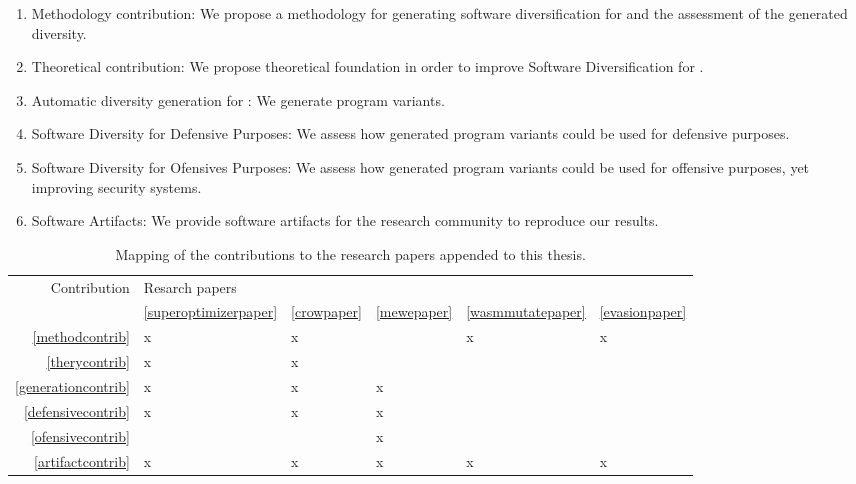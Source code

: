\begin{enumerate}[label=\textbf{C\arabic*}:, ref=C\arabic*]
	\item \label{methodcontrib} Methodology contribution: We propose a methodology for generating software diversification for \Wasm and the assessment of the generated diversity.
	
	\item \label{therycontrib} Theoretical contribution: We propose theoretical foundation in order to improve Software Diversification for \Wasm.
	
	\item \label{generationcontrib} Automatic diversity generation for \Wasm: We generate \Wasm program variants.
	
	\item \label{defensivecontrib} Software Diversity for Defensive Purposes: We assess how generated \Wasm program variants could be used for defensive purposes.
	
	\item \label{ofensivecontrib} Software Diversity for Ofensives Purposes: We assess how generated \Wasm program variants could be used for offensive purposes, yet improving security systems.
	
	\item \label{artifactcontrib} Software Artifacts: We provide software artifacts for the research community to reproduce our results.
\end{enumerate}


\begin{table}
	\begin{tabular}{r | l l l l l }
		Contribution & Resarch  papers \\
		& \ref{superoptimizerpaper} & \ref{crowpaper} & \ref{mewepaper} & \ref{wasmmutatepaper} & \ref{evasionpaper} \\
		\hline
		\ref{methodcontrib} & x & x &  & x & x \\
		\ref{therycontrib} & x & x &  &  &  \\
		\ref{generationcontrib} & x & x & x\\
		\ref{defensivecontrib} & x & x & x\\
		\ref{ofensivecontrib} & & & x\\
		\ref{artifactcontrib} & x & x & x & x & x
	\end{tabular}
	\label{contribmap}
	\caption{Mapping of the contributions to the research papers appended to this thesis.}
\end{table}

